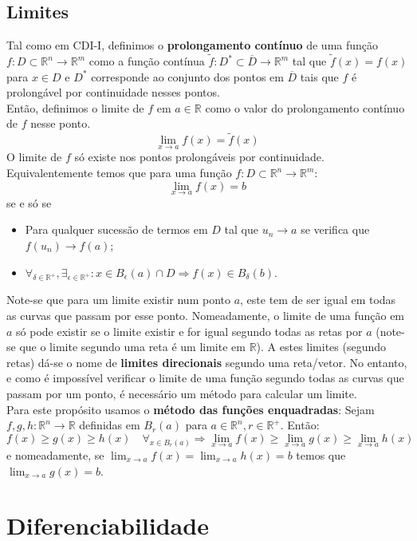 \documentclass{article}
\newcommand{\R}{\mathbb{R}}
\begin{document}
\subsection{Limites}
Tal como em CDI-I, definimos o \textbf{prolongamento contínuo} de uma função $f: D \subset \R^n \to \R^m$ como a função contínua $\tilde{f}: D^* \subset \overline{D} \to \R^m$ tal que $\tilde{f}(x) = f(x)$ para $x \in D$ e $D^*$ corresponde ao conjunto dos pontos em $\overline{D}$ tais que $f$ é prolongável por continuidade nesses pontos.\\
Então, definimos o limite de $f$ em $a \in \R$ como o valor do prolongamento contínuo de $f$ nesse ponto.
$$
\lim_{x \to a} f(x) = \tilde{f}(x)
$$
O limite de $f$ só existe nos pontos prolongáveis por continuidade.\\
Equivalentemente temos que para uma função $f: D \subset \R^n \to \R^m$:
$$
\lim_{x \to a} f(x) = b
$$
se e só se
\begin{itemize}
	\item Para qualquer sucessão de termos em $D$ tal que $u_n \to a$ se verifica que $f(u_n) \to f(a)$;
	\item $\forall_{\delta \in \R^+}, \exists_{\epsilon \in \R^+}: x \in B_\epsilon(a) \cap D \Rightarrow f(x) \in B_\delta(b)$.
\end{itemize}
Note-se que para um limite existir num ponto $a$, este tem de ser igual em todas as curvas que passam por esse ponto. Nomeadamente, o limite de uma função em $a$ só pode existir se o limite existir e for igual segundo todas as retas por $a$ (note-se que o limite segundo uma reta é um limite em $\R$). A estes limites (segundo retas) dá-se o nome de \textbf{limites direcionais} segundo uma reta/vetor.
No entanto, e como é impossível verificar o limite de uma função segundo todas as curvas que passam por um ponto, é necessário um método para calcular um limite.\\
Para este propósito usamos o \textbf{método das funções enquadradas}: Sejam $f,g,h: \R^n \to \R$ definidas em $B_r(a)$ para $a \in \R^n, r \in \R^+$. Então:
$$
f(x) \geq g(x) \geq h(x) \quad \forall_{x \in B_r(a)} \Rightarrow \lim_{x \to a} f(x) \geq \lim_{x \to a} g(x) \geq \lim_{x \to a} h(x) 
$$
e nomeadamente, se $\lim_{x \to a} f(x) = \lim_{x \to a} h(x) = b$ temos que $\lim_{x \to a} g(x) = b$.

\section{Diferenciabilidade}
\end{document}
